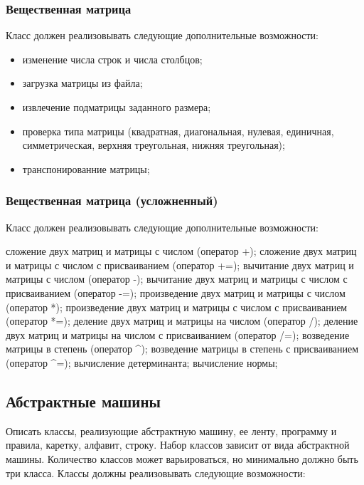 \documentclass[a4paper,12pt]{article}
\begin{document}
\subsubsection{Вещественная матрица}

Класс должен реализовывать следующие дополнительные возможности:

\begin{itemize}
\item изменение числа строк и числа столбцов;
\item загрузка матрицы из файла;
\item извлечение подматрицы заданного размера;
\item проверка типа матрицы (квадратная, диагональная, нулевая,
  единичная, симметрическая, верхняя треугольная, нижняя треугольная);
\item транспонированние матрицы;
\end{itemize}

\subsubsection{Вещественная матрица (усложненный)}

Класс должен реализовывать следующие дополнительные возможности:

сложение двух матриц и матрицы с числом (оператор +);
сложение двух матриц и матрицы с числом с присваиванием (оператор +=);
вычитание двух матриц и матрицы с числом (оператор -);
вычитание двух матриц и матрицы с числом с присваиванием (оператор -=);
произведение двух матриц и матрицы с числом (оператор *);
произведение двух матриц и матрицы с числом с присваиванием (оператор *=);
деление двух матриц и матрицы на числом (оператор /);
деление двух матриц и матрицы на числом с присваиванием (оператор /=);
возведение матрицы в степень (оператор ^);
возведение матрицы в степень с присваиванием (оператор ^=);
вычисление детерминанта;
вычисление нормы; 

\subsection{Абстрактные машины}

Описать классы, реализующие абстрактную машину, ее ленту, программу и
правила, каретку, алфавит, строку. Набор классов зависит от вида
абстрактной машины. Количество классов может варьироваться, но
минимально должно быть три класса.  Классы должны реализовывать
следующие возможности:
\end{document}
